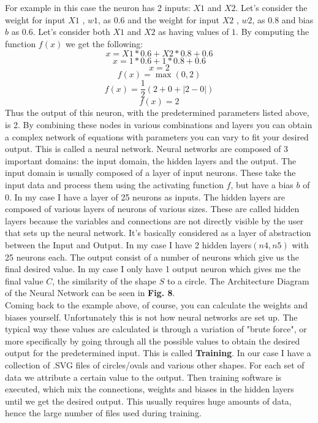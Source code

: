 \documentclass[9pt,onecolumn,oneside]{osajnl}
\begin{document}
    For example in this case the neuron has 2 inputs: \(X1\) and \(X2\). Let's consider the weight for input \(X1\) , \(w1\), as \(0.6\) and the weight for input \(X2\) , \(w2\),  as 0.8 and bias \(b\) as 0.6. Let's consider both \(X1\) and \(X2\) as having values of \(1\). By computing the function \(f(x)\) we get the following:
\[x = X1 * 0.6 + X2 * 0.8 + 0.6\]
\[ x = 1 * 0.6 + 1 * 0.8 + 0.6 \]
\[x = 2\]
\[f(x) = \max(0,2)\]
\[f(x) = \frac{1}{2}(2+0+|2-0|) \]
\[ f(x) = 2\]
	Thus the output of this neuron, with the predetermined parameters listed above, is 2. By combining these nodes in various combinations and layers you can obtain a complex network of equations with parameters you can vary to fit your desired output. This is called a  neural network. Neural networks are composed of 3 important domains: the input domain, the hidden layers and the output. The input domain is usually composed of a layer of input neurons. These take the input data and process them using the activating function \(f\), but have a bias \(b\) of 0. In my case I have a layer of 25 neurons as inputs. The hidden layers are composed of various layers of neurons of various sizes. These are called hidden layers because the variables and connections are not directly visible by the user that sets up the neural network. It's basically considered as a layer of abstraction between the Input and Output. In my case I have 2 hidden layers\((n4, n5)\) with 25 neurons each. The output consist of a number of neurons which give us the final desired value. In my case I only have 1 output neuron which gives me the final value \(C\), the similarity of the shape \(S\) to a circle. The Architecture Diagram of the Neural Network can be seen in \textbf{Fig. 8}.\\
    
  

  Coming back to the example above, of course, you can calculate the weights and biases yourself. Unfortunately this is not how neural networks are set up. The typical way these values are calculated is through a variation of "brute force", or more specifically by going through all the possible values to obtain the desired output for the predetermined input. This is called \textbf{Training}. In our case I have a collection of .SVG files of circles/ovals and various other shapes. For each set of data we attribute a certain value to the output. Then training software is executed, which mix the connections, weights and biases in the hidden layers until we get the desired output. This usually requires huge amounts of data, hence the large number of files used during training.\\
  
\end{document}
